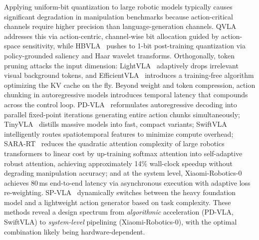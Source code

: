 \documentclass[acmsmall,screen,review,anonymous]{acmart}
\begin{document}
Applying uniform-bit quantization to large robotic models typically causes significant degradation in manipulation benchmarks because action-critical channels require higher precision than language-generation channels. QVLA~\cite{xu2026qvla} addresses this via action-centric, channel-wise bit allocation guided by action-space sensitivity, while HBVLA~\cite{yan2026hbvla} pushes to 1-bit post-training quantization via policy-grounded saliency and Haar wavelet transforms. Orthogonally, token pruning attacks the input dimension: LightVLA~\cite{jiang2025lightvla} adaptively drops irrelevant visual background tokens, and EfficientVLA~\cite{yang2025efficientvla} introduces a training-free algorithm optimizing the KV cache on the fly. Beyond weight and token compression, action chunking in autoregressive models introduces temporal latency that compounds across the control loop. PD-VLA~\cite{pdvla2025} reformulates autoregressive decoding into parallel fixed-point iterations generating entire action chunks simultaneously; TinyVLA~\cite{wen2025tinyvla} distills massive models into fast, compact variants; SwiftVLA~\cite{ni2025swiftvla} intelligently routes spatiotemporal features to minimize compute overhead; SARA-RT~\cite{shi2024sarart} reduces the quadratic attention complexity of large robotics transformers to linear cost by up-training softmax attention into self-adaptive robust attention, achieving approximately 14\% wall-clock speedup without degrading manipulation accuracy; and at the system level, Xiaomi-Robotics-0~\cite{cai2026xiaomirobotics0} achieves 80\,ms end-to-end latency via asynchronous execution with adaptive loss re-weighting. SP-VLA~\cite{li2025spvla} dynamically switches between the heavy foundation model and a lightweight action generator based on task complexity. These methods reveal a design spectrum from \emph{algorithmic} acceleration (PD-VLA, SwiftVLA) to \emph{system-level} pipelining (Xiaomi-Robotics-0), with the optimal combination likely being hardware-dependent.
\end{document}
